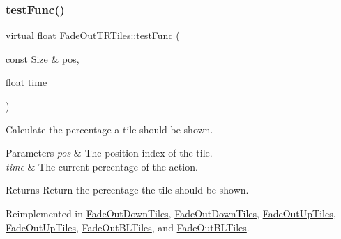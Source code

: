 \mbox{\label{classFadeOutTRTiles_ad60de48e058a74552cec41eea2bb2507}} 
\subsubsection{\texorpdfstring{test\+Func()}{testFunc()}\hspace{0.1cm}{\footnotesize\ttfamily [2/2]}}
{\footnotesize\ttfamily virtual float Fade\+Out\+T\+R\+Tiles\+::test\+Func (\begin{DoxyParamCaption}\item[{const \hyperlink{classSize}{Size} \&}]{pos,  }\item[{float}]{time }\end{DoxyParamCaption})\hspace{0.3cm}{\ttfamily [virtual]}}



Calculate the percentage a tile should be shown. 


\begin{DoxyParams}{Parameters}
{\em pos} & The position index of the tile. \\
\hline
{\em time} & The current percentage of the action. \\
\hline
\end{DoxyParams}
\begin{DoxyReturn}{Returns}
Return the percentage the tile should be shown. 
\end{DoxyReturn}


Reimplemented in \hyperlink{classFadeOutDownTiles_a650db33238577e696174930b01d06045}{Fade\+Out\+Down\+Tiles}, \hyperlink{classFadeOutDownTiles_a6fa98b6fda5e72b41542f4209866c3f3}{Fade\+Out\+Down\+Tiles}, \hyperlink{classFadeOutUpTiles_ac01a15f89dca9a3a4c1585031abf6d2c}{Fade\+Out\+Up\+Tiles}, \hyperlink{classFadeOutUpTiles_a8a0a0c36e5c02a518dc649b2ec7d8864}{Fade\+Out\+Up\+Tiles}, \hyperlink{classFadeOutBLTiles_a17aa884f96bbdc18e8500bfb5bf68257}{Fade\+Out\+B\+L\+Tiles}, and \hyperlink{classFadeOutBLTiles_a00586757931bcc6166dc5052b0ef2633}{Fade\+Out\+B\+L\+Tiles}.

\mbox{\label{classFadeOutTRTiles_affe9ea8485d27ecab09eb0e9ee5d0129}} 
